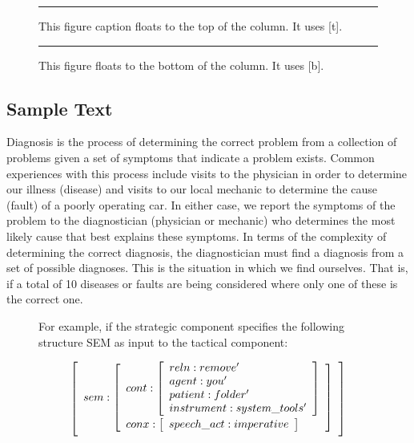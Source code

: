 \begin{article}
\begin{figure}[t]
\hrule
\vspace*{1in}
\caption{This figure caption floats to the
top of the column. It uses
[t].}
\end{figure}

\begin{figure}[b]
\hrule
\vspace*{1.4in}
\caption{This figure floats to the bottom of the
column. It uses [b].}
\end{figure}

\subsection{Sample Text}
Diagnosis is the process of determining the correct problem from a
collection of problems given a set of symptoms that indicate a
problem exists.  Common experiences with this process include visits
to the physician in order to determine our illness (disease) and
visits to our local mechanic to determine the cause (fault) of a
poorly operating car.  In either case, we report the symptoms of the
problem to the diagnostician (physician or mechanic) who determines
the most likely cause that best explains these symptoms.  In terms of
the complexity of determining the correct diagnosis, the
diagnostician must find a diagnosis from a set of possible diagnoses.
This is the situation in which we find ourselves.
That is, if a total of 10 diseases or faults are being considered
where only one of these is the correct one.


\begin{figure}[p]
For example, if the strategic component specifies the following
structure SEM as input to the tactical component:

\newcommand{\fs}{\left[\begin{array}{l}}
\newcommand{\fsfs}{\end{array}\right]\vspace{0.5ex}}

\[
\fs sem: \fs
cont: \fs reln: remove'\\
          agent: you'\\
          patient: folder'\\
          instrument: system\_tools' \fsfs\\
conx: \fs speech\_act: imperative \fsfs \fsfs \fsfs
\]


\end{figure}
\end{article}
